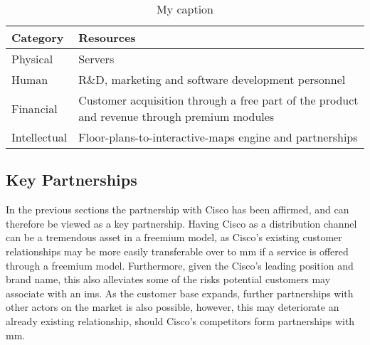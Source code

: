 \begin{table}[]
\centering
\caption{My caption}
\label{my-label}
\begin{tabular}{|l|l|}
\hline
\textbf{Category} & \textbf{Resources}                                                                          \\ \hline
Physical          & Servers                                                                                     \\ \hline
Human             & R\&D, marketing and software development personnel                                          \\ \hline
Financial         & Customer acquisition through a free part of the product and revenue through premium modules \\ \hline
Intellectual      & Floor-plans-to-interactive-maps engine and partnerships                                     \\ \hline
\end{tabular}
\end{table}


\subsection{Key Partnerships}
In the previous sections the partnership with Cisco has been affirmed, and can therefore be viewed as a key partnership. Having Cisco as a distribution channel can be a tremendous asset in a freemium model, as Cisco's existing customer relationships may be more easily transferable over to \gls{mm} if a service is offered through a freemium model. Furthermore, given the Cisco's leading position and brand name, this also alleviates some of the risks potential customers may associate with an \gls{ims}.  As the customer base expands, further partnerships with other actors on the market is also possible, however, this may deteriorate an already existing relationship, should Cisco's competitors form partnerships with \gls{mm}. 


